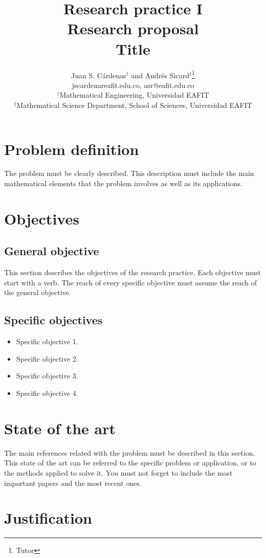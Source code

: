\documentclass[11pt,letterpaper]{article}
\author{Juan S. Cárdenas$^\dag$ and Andrés Sicard$^\ddag$\footnote{ Tutor} \\ \vspace{0.3cm}\small{jscardenareafit.edu.co, asr@eafit.edu.co}\\ $^\dag$Mathematical Engineering, Universidad EAFIT\\ $^\ddag$Mathematical Science Department, School of Sciences, Universidad EAFIT}
\title{\large Research practice I\\ \vspace{0.2cm} Research proposal\\ \vspace{0.5cm} \LARGE Title}
\begin{document}
\maketitle


\section{Problem definition}

The problem must be clearly described. This description must include the main mathematical elements that the problem involves as well as its applications.


\section{Objectives}

\subsection{General objective}

This section describes the objectives of the research practice. Each objective must start with a verb. The reach of every specific objective must assume the reach of the general objective.

\subsection{Specific objectives}

\begin{itemize}
\item Specific objective 1.
\item Specific objective 2.
\item Specific objective 3.
\item Specific objective 4.
\end{itemize}


\section{State of the art}

The main references related with the problem must be described in this section. This state of the art can be referred to the specific problem or application, or to the methods applied to solve it. You must not forget to include the most important papers and the most recent ones.


\section{Justification}
\end{document}
